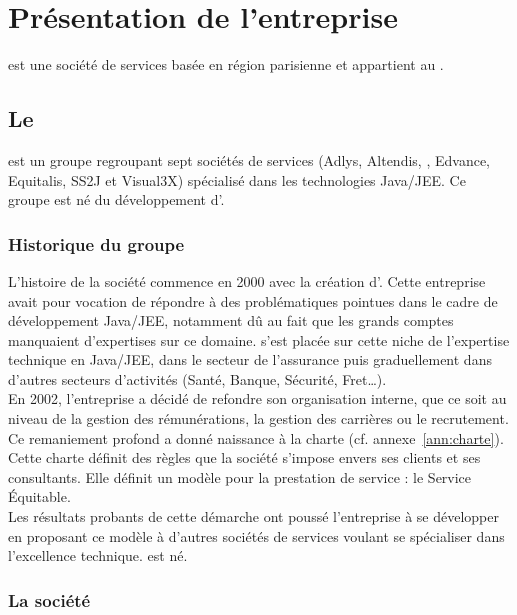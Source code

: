 \chapter{Présentation de l'entreprise}

\ebi{} est une société de services basée en région parisienne et appartient au \excilysGroup{} \cite{excilys}.

\section{Le \excilysGroup{}}

\excilys{} est un groupe regroupant sept sociétés de services (Adlys, Altendis, \ebi{}, Edvance, Equitalis, SS2J et Visual3X) spécialisé dans les technologies Java/JEE. Ce groupe est né du développement d'\ebi{}.

\subsection{Historique du groupe}

L'histoire de la société commence en 2000 avec la création d'\ebi{}. Cette entreprise avait pour vocation de répondre à des problématiques pointues dans le cadre de développement Java/JEE, notamment dû au fait que les grands comptes manquaient d'expertises sur ce domaine.
\ebi{} s'est placée sur cette niche de l'expertise technique en Java/JEE, dans le secteur de l'assurance puis graduellement dans d'autres secteurs d’activités (Santé, Banque, Sécurité, Fret…).\\

En 2002, l’entreprise a décidé de refondre son organisation interne, que ce soit au niveau de la gestion des rémunérations, la gestion des carrières ou le recrutement. Ce remaniement profond a donné naissance à la charte \excilys{} (cf. annexe~\ref{ann:charte}).
Cette charte définit des règles que la société s'impose envers ses clients et ses consultants. Elle définit un modèle pour la prestation de service : le Service Équitable.\\

Les résultats probants de cette démarche ont poussé l'entreprise à se développer en proposant ce modèle à d'autres sociétés de services voulant se spécialiser dans l'excellence technique. \excilys{} est né.

\subsection{La société \ebi{}}

